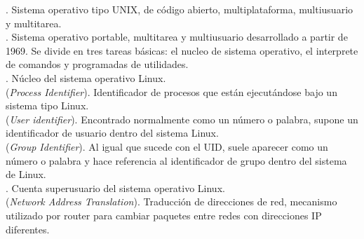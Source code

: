 \documentclass[a4paper, oneside, 12pt]{book}
\begin{document}
		 
		 
	
	. Sistema operativo tipo UNIX, de código abierto, multiplataforma, multiusuario y multitarea.\\
	
	. Sistema operativo portable, multitarea y multiusuario desarrollado a partir de 1969. Se divide en tres tareas básicas: el nucleo de sistema operativo, el interprete de comandos y programadas de utilidades.  \\
		 
	. Núcleo del sistema operativo Linux.\\
		 
	 (\textit{Process Identifier}). Identificador de procesos que están ejecutándose bajo un sistema tipo Linux.\\
	
	 (\textit{User identifier}). Encontrado normalmente como un número o palabra, supone un identificador de usuario dentro del sistema Linux.\\
	
	 (\textit{Group Identifier}). Al igual que sucede con el UID, suele aparecer como un número o palabra y hace referencia al identificador de grupo dentro del sistema de Linux.\\
		 
	. Cuenta superusuario del sistema operativo Linux.\\
		 
	
	 (\textit{Network Address Translation}). Traducción de direcciones de red, mecanismo utilizado por router para cambiar paquetes entre redes con direcciones IP diferentes.\\
	
\end{document}
